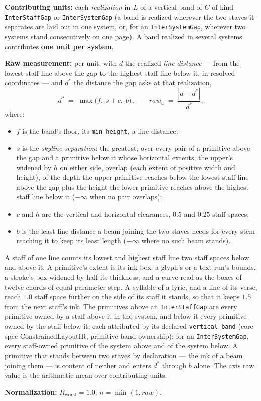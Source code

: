 \documentclass[11pt,letterpaper]{report}
\newcommand{\sectionsc}[1]{{\addfontfeatures{Letters=SmallCaps}#1}}
\newcounter{requirement}[chapter]
\begin{document}
\begin{requirement}
\label{req:qmc:vertical}
\textbf{Contributing units:} each \emph{realization} in $L$ of a vertical
band of $C$ of kind \texttt{InterStaffGap} or \texttt{InterSystemGap} (a band
is realized wherever the two staves it separates are laid out in one system,
or, for an \texttt{InterSystemGap}, wherever two systems stand consecutively
on one page). A band realized in several systems contributes \textbf{one unit
per system}.

\textbf{Raw measurement:} per unit, with $d$ the realized \emph{line
distance} --- from the lowest staff line above the gap to the highest staff
line below it, in resolved coordinates --- and $d^{*}$ the distance the gap
asks at that realization,
\[
  d^{*} \;=\; \max\bigl(f,\; s + c,\; b\bigr),
  \qquad
  \mathit{raw}_u \;=\; \frac{|d - d^{*}|}{d^{*}},
\]
where:
\begin{itemize}
  \item $f$ is the band's floor, its \texttt{min\_height}, a line distance;
  \item $s$ is the \emph{skyline separation}: the greatest, over every pair
    of a primitive above the gap and a primitive below it whose horizontal
    extents, the upper's widened by $h$ on either side, overlap (each extent
    of positive width and height), of the depth the upper primitive reaches
    below the lowest staff line above the gap plus the height the lower
    primitive reaches above the highest staff line below it ($-\infty$ when
    no pair overlaps);
  \item $c$ and $h$ are the vertical and horizontal clearances, $0.5$ and
    $0.25$ staff spaces;
  \item $b$ is the least line distance a beam joining the two staves needs
    for every stem reaching it to keep its least length ($-\infty$ where no
    such beam stands).
\end{itemize}
A staff of one line counts its lowest and highest staff line two staff spaces
below and above it. A primitive's extent is its ink box: a glyph's or a text
run's bounds, a stroke's box widened by half its thickness, and a curve read as
the boxes of twelve chords of equal parameter step. A syllable of a lyric, and a line of
its verse, reach $1.0$ staff space further on the side of its staff it stands,
so that it keeps $1.5$ from the next staff's ink. The primitives above an
\texttt{InterStaffGap} are every primitive owned by a staff above it in the
system, and below it every primitive owned by the staff below it, each
attributed by its declared \texttt{vertical\_band} (core spec
\sectionsc{ConstrainedLayoutIR}, primitive band ownership); for an
\texttt{InterSystemGap}, every staff-owned primitive of the system above and
of the system below. A primitive that stands between two staves by
declaration --- the ink of a beam joining them --- is content of neither and
enters $d^{*}$ through $b$ alone. The axis raw value is the arithmetic mean
over contributing units.

\textbf{Normalization:} $R_{\mathrm{worst}} = 1.0$;
$n = \min(1, \mathit{raw})$.
\end{requirement}
\end{document}
